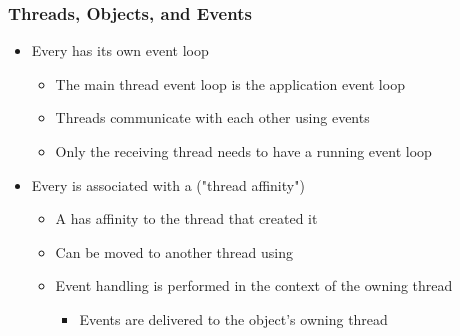 \begin{slide}
\frametitle{Threads, Objects, and Events}

\begin{itemize}
\item Every  has its own event loop
  \begin{itemize}
  \item The main thread event loop is the application event loop
  \item Threads communicate with each other using events
  \item Only the receiving thread needs to have a running event loop
  \end{itemize}
\item Every  is associated with a  ("thread affinity")
  \begin{itemize}
  \item A  has affinity to the thread that created it
  \item Can be moved to another thread using 
  \item Event handling is performed in the context of the owning thread
    \begin{itemize}
    \item Events are delivered to the object's owning thread
    \end{itemize}
  \end{itemize}
\end{itemize}

\end{slide}


